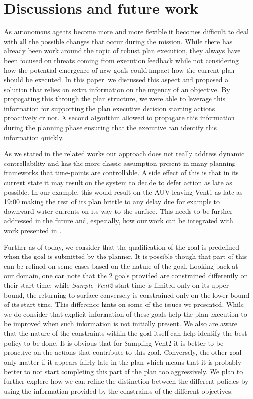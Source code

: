 \section{Discussions and future work}
\label{sec:conclude}

As autonomous agents become more and more flexible it becomes difficult
to deal with all the possible changes that occur during the
mission. While there has already been work around the topic of robust
plan execution, they always have been focused on threats coming from
execution feedback while not considering how the potential emergence of
new goals could impact how the current plan should be executed. In this
paper, we discussed this aspect and proposed a solution that relies on
extra information on the urgency of an objective. By propagating this
through the plan structure, we were able to leverage this information for
supporting the plan executive decision starting actions proactively or
not. A second algorithm allowed to propagate this information during the
planning phase ensuring that the executive can identify this information
quickly.

 As we stated in the related works our approach does not
really address dynamic controllability and has the more classic
assumption present in many planning frameworks that time-points are
controllable. A side effect of this is that in its current state it
may result on the system to decide to defer action as late as
possible. In our example, this would result on the AUV leaving Vent1
as late as 19:00 making the rest of its plan brittle to any delay due
for example to downward water currents on its way to the surface. This
needs to be further addressed in the future and, especially, how our
work can be integrated with work presented in \cite{morris01}.

Further as of today, we consider that the qualification of the goal is
predefined when the goal is submitted by the planner. It is possible
though that part of this can be refined on some cases based on the
nature of the goal. Looking back at our domain, one can note that the
2 goals provided are constrained differently on their start time;
while {\em Sample Vent2} start time is limited only on its upper
bound, the returning to surface conversely is constrained only on the
lower bound of its start time. This difference hints on some of the
issues we presented. While we do consider that explicit information of
these goals help the plan execution to be improved when such
information is not initially present. We also are aware that the
nature of the constraints within the goal itself can help identify the
best policy to be done. It is obvious that for Sampling Vent2 it is
better to be proactive on the actions that contribute to this
goal. Conversely, the other goal only matter if it appears fairly late
in the plan which means that it is probably better to not start
completing this part of the plan too aggressively. We plan to further
explore how we can refine the distinction between the different
policies by using the information provided by the constraints of the
different objectives.
 
